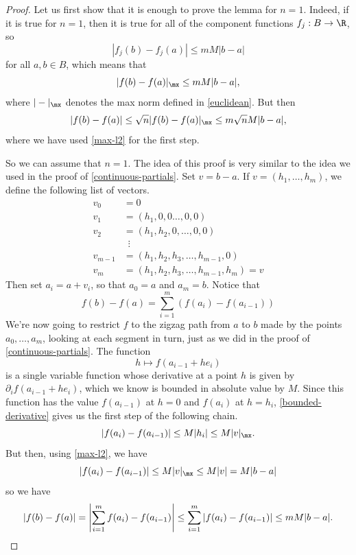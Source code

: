 \begin{proof}
	Let us first show that it is enough to prove the lemma for $n = 1$. Indeed, if it is true for $n = 1$, then it is true for all of the component functions $f_j : B \to \R$, so
	\[ |f_j(b) - f_j(a)| \leq mM|b-a| \]
	for all $a, b \in B$, which means that
	\[ |f(b) - f(a)|_\mx \leq mM|b-a|, \]
	where $|-|_\mx$ denotes the max norm defined in \cref{euclidean}. But then
	\[ |f(b)-f(a)| \leq \sqrt{n} |f(b)-f(a)|_\mx \leq m\sqrt{n}M |b-a|, \]
	where we have used \cref{max-l2} for the first step. 
	
	So we can assume that $n = 1$. The idea of this proof is very similar to the idea we used in the proof of  \cref{continuous-partials}. Set $v = b-a$. If $v = (h_1, \dotsc, h_m)$, we define the following list of vectors. 
	\[ \begin{aligned} 
	v_0 &= 0 \\
	v_1 &= (h_1, 0, 0 \dotsc, 0, 0) \\
	v_2 &= (h_1, h_2, 0, \dotsc, 0, 0) \\
	&\enspace \vdots \\
	v_{m-1} &= (h_1, h_2, h_3, \dotsc, h_{m-1}, 0) \\
	v_m &= (h_1, h_2, h_3, \dotsc, h_{m-1}, h_m) = v \end{aligned} \]
	Then set $a_i = a + v_i$, so that $a_0 = a$ and $a_m = b$. Notice that
	\[ f(b) - f(a) = \sum_{i = 1}^m (f(a_i ) - f(a_{i-1})) \]
	We're now going to restrict $f$ to the zigzag path from $a$ to $b$ made by the points $a_0, \dotsc, a_m$, looking at each segment in turn, just as we did in the proof of \cref{continuous-partials}. The function
	\[ h \mapsto f(a_{i-1} + he_i) \]
	is a single variable function whose derivative at a point $h$ is given by $\partial_i f(a_{i-1} + he_i)$, which we know is bounded in absolute value by $M$. Since this function has the value $f(a_{i-1})$ at $h = 0$ and $f(a_i)$ at $h = h_i$, \cref{bounded-derivative} gives us the first step of the following chain. 
	\[ |f(a_i) - f(a_{i-1})| \leq M|h_i| \leq M|v|_\mx. \]
	But then, using \cref{max-l2}, we have
	\[ |f(a_i) - f(a_{i-1})| \leq M|v|_\mx \leq M|v| = M|b-a| \]
	so we have
	\[ |f(b) - f(a)| = \left| \sum_{i = 1}^m f(a_i) - f(a_{i-1}) \right| \leq \sum_{i = 1}^m |f(a_i) - f(a_{i-1})| \leq mM|b-a|. \qedhere \]
\end{proof}

